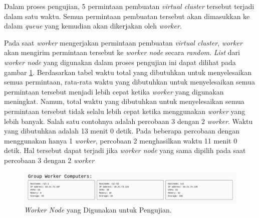 Dalam proses pengujian, 5 permintaan pembuatan \emph{virtual cluster}
tersebut terjadi dalam satu waktu. Semua permintaan pembuatan tersebut
akan dimasukkan ke dalam \emph{queue} yang kemudian akan dikerjakan oleh
\emph{worker}.

Pada saat \emph{worker} mengerjakan permintaan pembuatan \emph{virtual cluster},
\emph{worker} akan mengirim permintaan tersebut ke \emph{worker node}
secara \emph{random}. \emph{List} dari \emph{worker node} yang digunakan
dalam proses pengujian ini dapat dilihat pada gambar \ref{fig:testing-worker-nodes}.
Berdasarkan tabel waktu total yang dibutuhkan untuk menyelesaikan
semua permintaan, rata-rata waktu yang dibutuhkan untuk menyelesaikan semua permintaan
tersebut menjadi lebih cepat ketika \emph{worker} yang digunakan meningkat.
Namun, total waktu yang dibutuhkan untuk menyelesaikan semua permintaan
tersebut tidak selalu lebih cepat ketika menggunakan \emph{worker} yang lebih banyak.
Salah satu contohnya adalah percobaan 3 dengan 2 \emph{worker}. Waktu yang
dibutuhkan adalah 13 menit 0 detik. Pada beberapa percobaan dengan menggunakan
hanya 1 \emph{worker}, percobaan 2 menghasilkan waktu 11 menit 0 detik. Hal tersebut
dapat terjadi jika \emph{worker node} yang sama dipilih pada saat percobaan 3 dengan 2 \emph{worker}

\begin{figure}[H]
  \centering
  \includegraphics[scale=0.365]{gambar/testing-workers.png}
  \caption{\emph{Worker Node} yang Digunakan untuk Pengujian.}
  \label{fig:testing-worker-nodes}
\end{figure}

